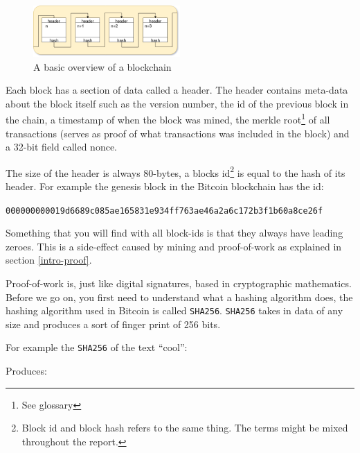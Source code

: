 \begin{figure}[H]
	\centering
	\includegraphics[width=0.5\textwidth]{introduction/images/blockchain.png}
	\caption{A basic overview of a blockchain}
	\label{fig:blockchain}
\end{figure}

Each block has a section of data called a header. The header contains meta-data
about the block itself such as the version number, the id of the previous block
in the chain, a timestamp of when the block was mined, the merkle root\footnote{See glossary} of
all transactions (serves as proof of what transactions was included in the block)
and a 32-bit field called nonce.

The size of the header is always 80-bytes, a blocks id\footnote{Block id and
block hash refers to the same thing. The terms might be mixed throughout the report.}
is equal to the hash of its header. For example the genesis block in the
Bitcoin blockchain has the id:

\texttt{000000000019d6689c085ae165831e934ff763ae46a2a6c172b3f1b60a8ce26f}

Something that you will find with all block-ids is that they always have leading zeroes.
This is a side-effect  caused by mining and proof-of-work as explained in section \ref{intro-proof}.

\label{intro-proof}
Proof-of-work is, just like digital signatures, based in cryptographic
mathematics. Before we go on, you first need to understand what a hashing
algorithm does, the hashing algorithm used in Bitcoin is called \texttt{SHA256}.
\texttt{SHA256} takes in data of any size and produces a sort of finger print
of 256 bits.

For example the \texttt{SHA256} of the text \enquote{cool}:


Produces:


